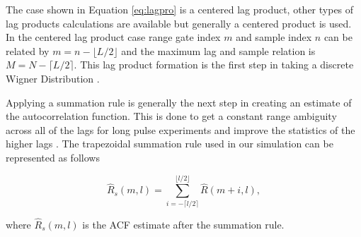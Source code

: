 \documentclass[draft,ras]{agutex}
\begin{document}
\begin{article}
The case shown in Equation \ref{eq:lagpro} is a centered lag product, other types of lag products calculations are available but generally a centered product is used. In the centered lag product case range gate index $m$ and sample index $n$ can be related by $m=n-\lfloor L/2\rfloor$ and the maximum lag and sample relation is $M=N-\lceil L/2 \rceil$.  This lag product formation is the first step in taking a discrete Wigner Distribution \citep{TFAcohen}.

%
%

Applying a summation rule is generally the next step in creating an estimate of the autocorrelation function.  This is done to get a constant range ambiguity across all of the lags for long pulse experiments and improve the statistics of the higher lags \citep{nygren1996}. The trapezoidal summation rule used in our simulation can be represented as follows

\begin{equation}
\label{eq:sumrule}
\hat{R}_s(m,l) = \displaystyle\sum\limits_{i=-\lceil l/2 \rceil}^{\lfloor l/2\rfloor} \hat{R}(m+i,l),
\end{equation}

\noindent where $\hat{R}_s(m,l)$ is the ACF estimate after the summation rule. %


\end{article}
\end{document}
